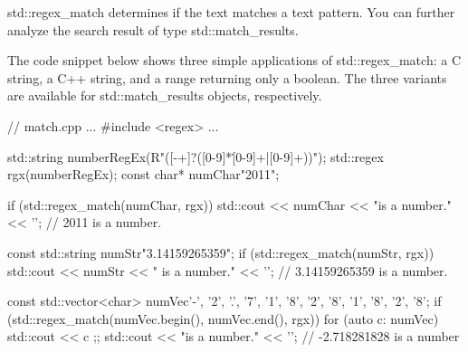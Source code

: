 
std::regex\_match determines if the text matches a text pattern. You can further analyze the search result of type std::match\_results.

The code snippet below shows three simple applications of std::regex\_match: a C string, a C++ string, and a range returning only a boolean. The three variants are available for std::match\_results objects, respectively.


\begin{cpp}
// match.cpp
...
#include <regex>
...

std::string numberRegEx(R"([-+]?([0-9]*\.[0-9]+|[0-9]+))");
std::regex rgx(numberRegEx);
const char* numChar{"2011"};

if (std::regex_match(numChar, rgx)){
	std::cout << numChar << "is a number." << '\n';
} // 2011 is a number.

const std::string numStr{"3.14159265359"};
if (std::regex_match(numStr, rgx)){
	std::cout << numStr << " is a number." << '\n';
} // 3.14159265359 is a number.

const std::vector<char> numVec{{'-', '2', '.', '7', '1', '8', '2',
								'8', '1', '8', '2', '8'}};
if (std::regex_match(numVec.begin(), numVec.end(), rgx)){
	for (auto c: numVec){ std::cout << c ;};
	std::cout << "is a number." << '\n';
} // -2.718281828 is a number
\end{cpp}


































